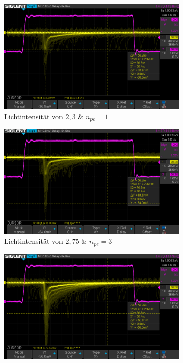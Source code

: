 \documentclass[12pt]{article}
\begin{document}
\begin{figure}[h!]
  \centering
  \begin{subfigure}{0.32\textwidth}
    \includegraphics[width=\textwidth]{Grafiken/4-1/4-1-1}
    \caption{Lichtintensität von $2,3$ \& $n_{pe} = 1$}
  \end{subfigure}
  \hfill
  \begin{subfigure}{0.32\textwidth}
    \includegraphics[width=\textwidth]{Grafiken/4-1/4-1-3}
    \caption{Lichtintensität von $2,75$ \& $n_{pe} = 3$}
  \end{subfigure}
  \hfill
  \begin{subfigure}{0.32\textwidth}
    \includegraphics[width=\textwidth]{Grafiken/4-1/4-1-2}

\end{subfigure}
\end{figure}
\end{document}
